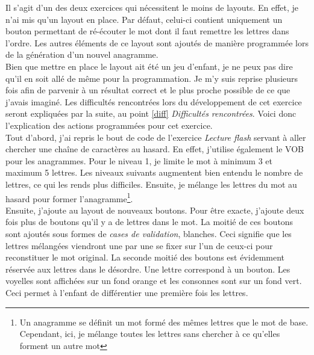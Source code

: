 Il s'agit d'un des deux exercices qui nécessitent le moins de layouts. En effet, je n'ai mis qu'un layout en place. Par défaut, celui-ci contient uniquement un bouton permettant de ré-écouter le mot dont il faut remettre les lettres dans l'ordre. Les autres éléments de ce layout sont ajoutés de manière programmée lors de la génération d'un nouvel anagramme.\\

Bien que mettre en place le layout ait été un jeu d'enfant, je ne peux pas dire qu'il en soit allé de même pour la programmation. Je m'y suis reprise plusieurs fois afin de parvenir à un résultat correct et le plus proche possible de ce que j'avais imaginé. Les difficultés rencontrées lors du développement de cet exercice seront expliquées par la suite, au point \ref{diff} \textit{Difficultés rencontrées}. Voici donc l'explication des actions programmées pour cet exercice.\\

Tout d'abord, j'ai repris le bout de code de l'exercice \textit{Lecture flash} servant à aller chercher une chaîne de caractères au hasard. En effet, j'utilise également le VOB pour les anagrammes. Pour le niveau 1, je limite le mot à minimum 3 et maximum 5 lettres. Les niveaux suivants augmentent bien entendu le nombre de lettres, ce qui les rends plus difficiles. Ensuite, je mélange les lettres du mot au hasard pour former l'anagramme\footnote{Un anagramme se définit un mot formé des mêmes lettres que le mot de base. Cependant, ici, je mélange toutes les lettres sans chercher à ce qu'elles forment un autre mot}.\\

Ensuite, j'ajoute au layout de nouveaux boutons. Pour être exacte, j'ajoute deux fois plus de boutons qu'il y a de lettres dans le mot. La moitié de ces boutons sont ajoutés sous formes de \textit{cases de validation}, blanches. Ceci signifie que les lettres mélangées viendront une par une se fixer sur l'un de ceux-ci pour reconstituer le mot original. La seconde moitié des boutons est évidemment réservée aux lettres dans le désordre. Une lettre correspond à un bouton. Les voyelles sont affichées sur un fond orange et les consonnes sont sur un fond vert. Ceci permet à l'enfant de différentier une première fois les lettres.\\

